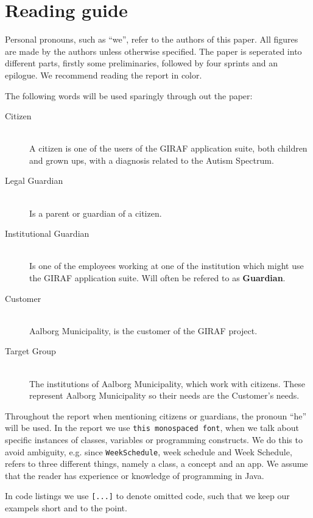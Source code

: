 \section*{Reading guide}
Personal pronouns, such as \enquote{we}, refer to the authors of this paper. 
All figures are made by the authors unless otherwise specified.
The paper is seperated into different parts, firstly some preliminaries, followed by four sprints and an epilogue.
We recommend reading the report in color.

The following words will be used sparingly through out the paper:
\begin{description}
    \item[Citizen] \hfill\\
        A citizen is one of the users of the GIRAF application suite, both children and grown ups, with a diagnosis related to the Autism Spectrum.
	\item[Legal Guardian] \hfill\\
        Is a parent or guardian of a citizen.
    \item[Institutional Guardian] \hfill\\
        Is one of the employees working at one of the institution which might use the GIRAF application suite. Will often be refered to as \textbf{Guardian}.
	\item[Customer] \hfill\\
        Aalborg Municipality, is the customer of the GIRAF project.
	\item[Target Group] \hfill\\
        The institutions of Aalborg Municipality, which work with citizens. These represent Aalborg Municipality so their needs are the Customer's needs.
\end{description}
Throughout the report when mentioning citizens or guardians, the pronoun \enquote{he} will be used.
In the report we use \texttt{this monospaced font}, when we talk about specific instances of classes, variables or programming constructs.
We do this to avoid ambiguity, e.g. since \texttt{WeekSchedule}, week schedule and Week Schedule, refers to three different things, namely a class, a concept and an app.
We assume that the reader has experience or knowledge of programming in Java.

In code listings we use \texttt{[...]} to denote omitted code, such that we keep our exampels short and to the point.
